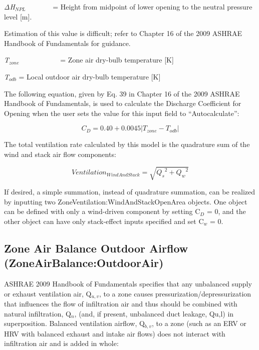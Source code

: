 \emph{ΔH\(_{NPL}\)}~~~~~~~ = Height from midpoint of lower opening to the neutral pressure level {[}m{]}.

Estimation of this value is difficult; refer to Chapter 16 of the 2009 ASHRAE Handbook of Fundamentals for guidance.

\emph{T\(_{zone}\)}~~~~~~~~~~~ = Zone air dry-bulb temperature {[}K{]}

\emph{T\(_{odb}\)} = Local outdoor air dry-bulb temperature {[}K{]}

The following equation, given by Eq. 39 in Chapter 16 of the 2009 ASHRAE Handbook of Fundamentals, is used to calculate the Discharge Coefficient for Opening when the user sets the value for this input field to ``Autocalculate'':

\begin{equation}
{C_D} = 0.40 + 0.0045\left| {{T_{zone}} - {T_{odb}}} \right|
\end{equation}

The total ventilation rate calculated by this model is the quadrature sum of the wind and stack air flow components:

\begin{equation}
Ventilatio{n_{WindAndStack}} = \sqrt {{Q_s}^2 + {Q_w}^2}
\end{equation}

If desired, a simple summation, instead of quadrature summation, can be realized by inputting two ZoneVentilation:WindAndStackOpenArea objects. One object can be defined with only a wind-driven component by setting C\(_{D}\) = 0, and the other object can have only stack-effect inputs specified and set C\(_{w}\) = 0.

\subsection{Zone Air Balance Outdoor Airflow (ZoneAirBalance:OutdoorAir)}\label{zone-air-balance-outdoor-airflow-zoneairbalanceoutdoorair}

ASHRAE 2009 Handbook of Fundamentals specifies that any unbalanced supply or exhaust ventilation air, Q\(_{u,v}\), to a zone causes pressurization/depressurization that influences the flow of infiltration air and thus should be combined with natural infiltration, Q\(_{n}\), (and, if present, unbalanced duct leakage, Qu,l) in superposition. Balanced ventilation airflow, Q\(_{b,v}\), to a zone (such as an ERV or HRV with balanced exhaust and intake air flows) does not interact with infiltration air and is added in whole:


